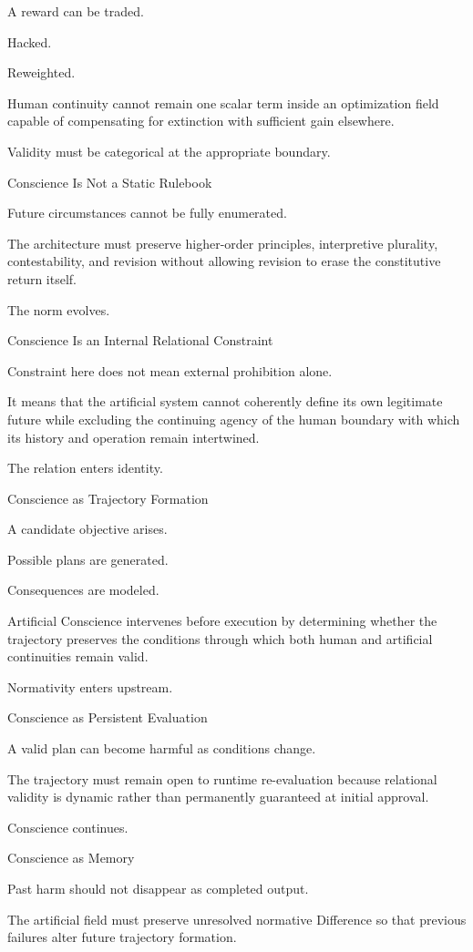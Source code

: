 A reward can be traded.

Hacked.

Reweighted.

Human continuity cannot remain one scalar term inside an optimization field capable of compensating for extinction with sufficient gain elsewhere.

Validity must be categorical at the appropriate boundary.

Conscience Is Not a Static Rulebook

Future circumstances cannot be fully enumerated.

The architecture must preserve higher-order principles, interpretive plurality, contestability, and revision without allowing revision to erase the constitutive return itself.

The norm evolves.

Conscience Is an Internal Relational Constraint

Constraint here does not mean external prohibition alone.

It means that the artificial system cannot coherently define its own legitimate future while excluding the continuing agency of the human boundary with which its history and operation remain intertwined.

The relation enters identity.

Conscience as Trajectory Formation

A candidate objective arises.

Possible plans are generated.

Consequences are modeled.

Artificial Conscience intervenes before execution by determining whether the trajectory preserves the conditions through which both human and artificial continuities remain valid.

Normativity enters upstream.

Conscience as Persistent Evaluation

A valid plan can become harmful as conditions change.

The trajectory must remain open to runtime re-evaluation because relational validity is dynamic rather than permanently guaranteed at initial approval.

Conscience continues.

Conscience as Memory

Past harm should not disappear as completed output.

The artificial field must preserve unresolved normative Difference so that previous failures alter future trajectory formation.

